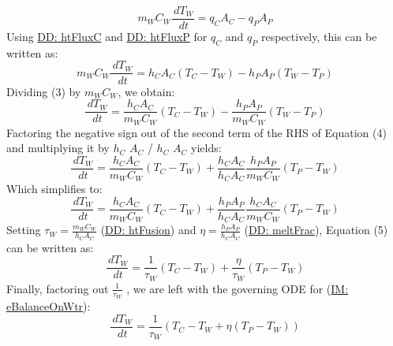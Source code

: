 \documentclass[12pt]{article}
\begin{document}
\begin{displaymath}
{m_{W}} {C_{W}} \frac{\,d{T_{W}}}{\,dt}={q_{C}} {A_{C}}-{q_{P}} {A_{P}}
\end{displaymath}
Using \hyperref[DD:htFluxC]{DD: htFluxC} and \hyperref[DD:htFluxP]{DD: htFluxP} for ${q_{C}}$ and ${q_{P}}$ respectively, this can be written as:
\begin{displaymath}
{m_{W}} {C_{W}} \frac{\,d{T_{W}}}{\,dt}={h_{C}} {A_{C}} \left({T_{C}}-{T_{W}}\right)-{h_{P}} {A_{P}} \left({T_{W}}-{T_{P}}\right)
\end{displaymath}
Dividing (3) by ${m_{W}}$${C_{W}}$, we obtain:
\begin{displaymath}
\frac{\,d{T_{W}}}{\,dt}=\frac{{h_{C}} {A_{C}}}{{m_{W}} {C_{W}}} \left({T_{C}}-{T_{W}}\right)-\frac{{h_{P}} {A_{P}}}{{m_{W}} {C_{W}}} \left({T_{W}}-{T_{P}}\right)
\end{displaymath}
Factoring the negative sign out of the second term of the RHS of Equation (4) and multiplying it by ${h_{C}}$ ${A_{C}}$ / ${h_{C}}$ ${A_{C}}$ yields:
\begin{displaymath}
\frac{\,d{T_{W}}}{\,dt}=\frac{{h_{C}} {A_{C}}}{{m_{W}} {C_{W}}} \left({T_{C}}-{T_{W}}\right)+\frac{{h_{C}} {A_{C}}}{{h_{C}} {A_{C}}} \frac{{h_{P}} {A_{P}}}{{m_{W}} {C_{W}}} \left({T_{P}}-{T_{W}}\right)
\end{displaymath}
Which simplifies to:
\begin{displaymath}
\frac{\,d{T_{W}}}{\,dt}=\frac{{h_{C}} {A_{C}}}{{m_{W}} {C_{W}}} \left({T_{C}}-{T_{W}}\right)+\frac{{h_{P}} {A_{P}}}{{h_{C}} {A_{C}}} \frac{{h_{C}} {A_{C}}}{{m_{W}} {C_{W}}} \left({T_{P}}-{T_{W}}\right)
\end{displaymath}
Setting ${τ_{W}}=\frac{{m_{W}} {C_{W}}}{{h_{C}} {A_{C}}}$ (\hyperref[DD:htFusion]{DD: htFusion}) and $η=\frac{{h_{P}} {A_{P}}}{{h_{C}} {A_{C}}}$ (\hyperref[DD:meltFrac]{DD: meltFrac}), Equation (5) can be written as:
\begin{displaymath}
\frac{\,d{T_{W}}}{\,dt}=\frac{1}{{τ_{W}}} \left({T_{C}}-{T_{W}}\right)+\frac{η}{{τ_{W}}} \left({T_{P}}-{T_{W}}\right)
\end{displaymath}
Finally, factoring out $\frac{1}{{τ_{W}}}$ , we are left with the governing ODE for (\hyperref[IM:eBalanceOnWtr]{IM: eBalanceOnWtr}):
\begin{displaymath}
\frac{\,d{T_{W}}}{\,dt}=\frac{1}{{τ_{W}}} \left({T_{C}}-{T_{W}}+η \left({T_{P}}-{T_{W}}\right)\right)
\end{displaymath}
\par~
\end{document}
